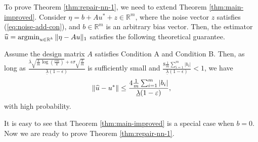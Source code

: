 To prove Theorem \ref{thm:repair-nn-1}, we need to extend Theorem \ref{thm:main-improved}. Consider $\eta=b+Au^*+z\in\mathbb{R}^m$, where the noise vector $z$ satisfies (\ref{eq:noise-add-con}), and $b\in\mathbb{R}^m$ is an arbitrary bias vector. Then, the estimator $\widehat{u}=\mathop{\rm argmin}_{u\in\mathbb{R}^k}\|\eta-Au\|_1$ satisfies the following theoretical guarantee.
\begin{thm}\label{thm:robust-reg-b}
Assume the design matrix $A$ satisfies Condition A and Condition B. Then, as long as $\frac{\overline{\lambda}\sqrt{\frac{k}{m}\log\left(\frac{em}{k}\right)}+\epsilon\sigma\sqrt{\frac{k}{m}}}{\underline{\lambda}(1-\epsilon)}$ is sufficiently small and $\frac{8\frac{1}{m}\sum_{i=1}^m|b_i|}{\underline{\lambda}(1-\epsilon)}<1$, we have
$$\|\widehat{u}-u^*\|\leq \frac{4\frac{1}{m}\sum_{i=1}^m|b_i|}{\underline{\lambda}(1-\varepsilon)},$$
with high probability.
\end{thm}
It is easy to see that Theorem \ref{thm:main-improved} is a special case when $b=0$.
Now we are ready to prove Theorem \ref{thm:repair-nn-1}.

